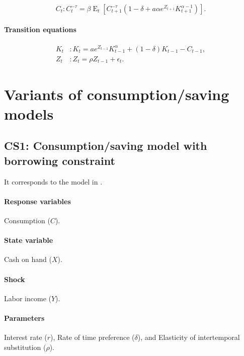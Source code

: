 \documentclass[11pt,fleqn]{article}
\DeclareMathOperator{\E}{E}
\begin{document}
\begin{equation}
  C_{t}: C_{t}^{-\tau}=\beta\E_{t}\left[C_{t+1}^{-\tau}\left(1-\delta+a \alpha e^{Z_{t+1}}K_{t+1}^{\alpha-1}\right)\right].
\end{equation}

\paragraph{Transition equations}

\begin{align}
  K_{t}&: K_{t}=a e^{Z_{t-1}}K_{t-1}^{\alpha}+\left(1-\delta\right)K_{t-1}-C_{t-1},\\
  Z_{t}&: Z_{t}=\rho Z_{t-1}+\epsilon_{t}.
\end{align}

\section{Variants of consumption/saving models}

\subsection{CS1: Consumption/saving model with borrowing constraint}

It corresponds to the model in \citet{Deat91}.

\paragraph{Response variables}
\label{sec:response-variables}

Consumption ($C$).

\paragraph{State variable}
\label{sec:state-variable}

Cash on hand ($X$).

\paragraph{Shock}

Labor income ($Y$).

\paragraph{Parameters}

Interest rate ($r$), Rate of time preference ($\delta$), and Elasticity of
intertemporal substitution ($\rho$).
\end{document}
